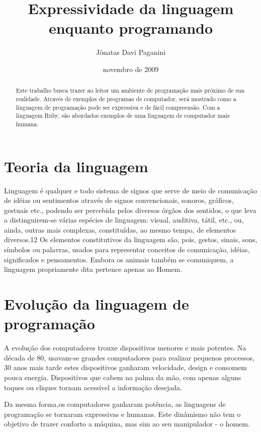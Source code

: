 \documentclass[espaco=simples,appendix=Name]{abnt}
\title{Expressividade da linguagem enquanto programando}
\author{Jônatas Davi Paganini}
\date{novembro de 2009}
\begin{document}
\maketitle
\begin{abstract}
Este trabalho busca trazer ao leitor um ambiente de programação mais próximo de sua realidade. Através de exemplos de programas de computador, será mostrado como a linguagem de programação pode ser expressiva e de fácil compreensão. Com a linguagem Ruby, são abordados exemplos de uma linguagem de computador mais humana.
\end{abstract}


\chapter{Teoria da linguagem}

Linguagem é qualquer e todo sistema de signos que serve de meio de comunicação de idéias ou sentimentos através de signos convencionais, sonoros, gráficos, gestuais etc., podendo ser percebida pelos diversos órgãos dos sentidos, o que leva a distinguirem-se várias espécies de linguagem: visual, auditiva, tátil, etc., ou, ainda, outras mais complexas, constituídas, ao mesmo tempo, de elementos diversos.12 Os elementos constitutivos da linguagem são, pois, gestos, sinais, sons, símbolos ou palavras, usados para representar conceitos de comunicação, idéias, significados e pensamentos. Embora os animais também se comuniquem, a linguagem propriamente dita pertence apenas ao Homem.

\cite{wikiLinguagem}

\chapter{Evolução da linguagem de programação}

A evolução dos computadores trouxe dispositivos menores e mais potentes. Na década de 80, usavam-se grandes computadores para realizar pequenos processos, 30 anos mais tarde estes dispositivos ganharam velocidade, design e consomem pouca energia. Dispositivos que cabem na palma da mão, com apenas alguns toques ou cliques tornam acessível a informação desejada. 

Da mesma forma,os computadores ganharam potência, as linguagens de programação se tornaram expressivas e humanas. Este dinâmismo não tem o objetivo de trazer conforto a máquina, mas sim ao seu manipulador - o homem. 
\end{document}
